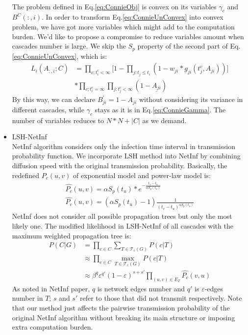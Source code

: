 \begin{itemize}
\begin{eqnarray}
\end{eqnarray}
The problem defined in Eq.\ref{eq:ConnieObj} is convex on its variables $\gamma_c$ and $B^C(:,i)$. 
In order to transform Eq.\ref{eq:ConnieUnConvex} into convex problem, we have got more variables which might add to the computation burden. We'd like to propose a compromise to reduce variables amount when cascades number is large. We skip the $S_p$ property of the second part of Eq.\ref{eq:ConnieUnConvex}, which is:
\begin{equation}
\begin{aligned}\label{eq:ConnieUnConvex}
L_{i}(A_{:,i};C) &=\prod_{c;t_i^c<\infty} \bigg[ 1-\prod_{j:t_j \leq t_i}(1-w_{ji}*g_{ji}(t_j^c,A_{ji}))\bigg] \\
 &\ast \prod_{c;t_i^c=\infty} \prod_{j:t_j^c<\infty}(1- \underline{A_{ji}})
\end{aligned}
\end{equation}
By this way, we can declare $B_{ji}^{'}=1-A_{ji}$ without considering its variance in different cascades, while $\gamma_c$ stays as it is in Eq.\ref{eq:ConnieGamma}. The number of variables reduces to $N*N+|C|$ as we demand.
\item LSH-NetInf
\\NetInf algorithm considers only the infection time interval in transmission probability function. We incorporate LSH method into NetInf by combining diffusion speed with the original transmission probability. Basically, the redefined $P_c(u,v)$ of exponential model and power-law model is:
\begin{eqnarray}
\hat{P_c}(u,v)=\alpha S_p(t_u)*e^{-\frac{t_v-t_u}{\alpha S_p(t_u)}} \nonumber \\
\hat{P_c}(u,v)=(\alpha S_p(t_u)-1)\frac{1}{(t_v-t_u)^{\alpha S_p(t_u)}} \nonumber
\end{eqnarray} 
NetInf does not consider all possible propagation trees but only the most likely one. The modified likelihood in LSH-NetInf of all cascades with the maximum weighted propagation tree is:
\begin{equation}
\begin{aligned}
P(C|G)&=\prod_{c\in C} \sum_{T\in \mathcal{T}_c(G)}P(c|T) \\
&\approx \prod_{c\in C} \max_{T\in \mathcal{T}_c(G)}P(c|T) \nonumber \\
&\approx \beta^q \varepsilon^{q'} (1-\varepsilon)^{s+s'}\prod_{(u,v)\in E_{T}}\hat{P_c}(v,u)
\end{aligned}
\end{equation}
As noted in NetInf paper, $q$ is network edges number and $q'$ is $\varepsilon$-edges number in $T$; $s$ and $s'$ refer to those that did not transmit respectively.
Note that our method just affects the pairwise transmission probability of the original NetInf algorithm without breaking its main structure or imposing extra computation burden.
\end{itemize} 

